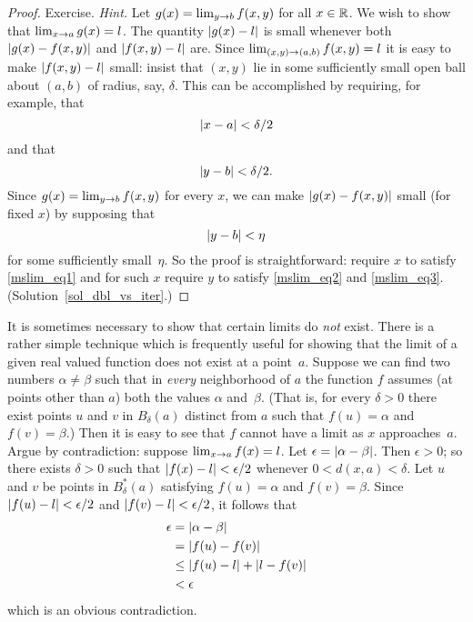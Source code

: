 \begin{proof} Exercise.  \emph{Hint.}  Let $g(x) = \lim_{y \rightarrow b}f(x,y)$ for all $x \in \mathbb{R}$.  We
wish to show that $\lim_{x \rightarrow a}g(x) = l$.  The quantity $\lvert g(x) - l\rvert$ is small whenever both
$\lvert g(x) - f(x,y)\rvert$ and $\lvert f(x,y) - l\rvert$ are.  Since $\lim_{(x,y) \rightarrow (a,b)}f(x,y) = l$ it is
easy to make $\lvert f(x,y) - l\rvert$ small: insist that $(x,y)$ lie in some sufficiently small open ball
about $(a,b)$ of radius, say, $\delta$.  This can be accomplished by requiring, for example, that
 \begin{equation}\label{mslim_eq1}
          \lvert x - a\rvert < \delta/2
 \end{equation}
and that
 \begin{equation}\label{mslim_eq2}
          \lvert y - b\rvert < \delta/2.
 \end{equation}
Since $g(x) = \lim_{y \rightarrow b}f(x,y)$ for every $x$, we can make $\lvert g(x) - f(x,y)\rvert$ small (for
fixed $x$) by supposing that
 \begin{equation}\label{mslim_eq3}
          \lvert y - b\rvert < \eta
 \end{equation}
for some sufficiently small~$\eta$.  So the proof is straightforward: require $x$ to satisfy
\eqref{mslim_eq1} and for such $x$ require $y$ to satisfy \eqref{mslim_eq2} and
\eqref{mslim_eq3}. (Solution~\ref{sol_dbl_vs_iter}.) \ns
\end{proof}

It is sometimes necessary to show that certain limits do \emph{not} exist. There is a rather simple
technique which is frequently useful for showing that the limit of a given real valued function
does not exist at a point~$a$.  Suppose we can find two numbers $\alpha \ne \beta$ such that in
\emph{every} neighborhood of $a$ the function $f$ assumes (at points other than $a$) both the
values $\alpha$ and~$\beta$.  (That is, for every $\delta > 0$ there exist points $u$ and $v$ in
$B_\delta(a)$ distinct from $a$ such that $f(u) = \alpha$ and $f(v) = \beta$.)  Then it is easy to
see that $f$ cannot have a limit as $x$ approaches~$a$.  Argue by contradiction: suppose $\lim_{x
\rightarrow a}f(x) = l$.  Let  $\epsilon = \lvert\alpha - \beta\rvert$.  Then $\epsilon > 0$; so there exists
$\delta > 0$ such that $\lvert f(x) - l\rvert < \epsilon/2$ whenever $0 < d(x,a) < \delta$.  Let $u$ and
$v$ be points in $B_\delta^*(a)$ satisfying $f(u) = \alpha$ and $f(v) = \beta$.  Since $\lvert f(u) -
l\rvert < \epsilon/2$ and $\lvert f(v) - l\rvert < \epsilon/2$, it follows that
 \begin{align*}
              \epsilon  &= \lvert\alpha - \beta\rvert   \\
                        &= \lvert f(u) - f(v)\rvert      \\
                        &\le \lvert f(u) - l\rvert + \lvert l - f(v)\rvert  \\
                        &< \epsilon
 \end{align*}
which is an obvious contradiction.

